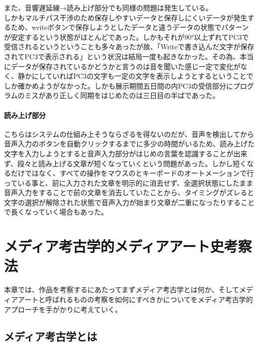 \documentclass[a4paper,report]{jsbook}
\begin{document}
また、音響遅延線→読み上げ部分でも同様の問題は発生している。\\
しかもマルチパス干渉のため保存しやすいデータと保存しにくいデータが発生するため、writeボタンで保存しようとしたデータと違うデータの状態でパターンが安定するという状態がほとんどであった。しかもそれが90°以上ずれてPC3で受信されるというということも多々あったが故、「Writeで書き込んだ文字が保存されてPC3で表示される」という状況は結局一度も起きなかった。その為、本当にデータが保存されているかどうかと言うのは音を聞いた感じ一定で変化がなく、静かにしていればPC3の文字も一定の文字を表示しようとするということでしか確かめようがなかった。しかも展示期間五日間の内PC3の受信部分にプログラムのミスがあり正しく同期をはじめたのは三日目の半ばであった。

\subsubsection{読み上げ部分}\label{ux8aadux307fux4e0aux3052ux90e8ux5206}

こちらはシステムの仕組み上そうならざるを得ないのだが、音声を検出してから音声入力のボタンを自動クリックするまでに多少の時間がいるため、読み上げた文字を入力しようとすると音声入力部分がはじめの言葉を認識することが出来ず、段々と読み上げる文章が短くなっていくという問題があった。しかし短くなるだけではなく、すべての操作をマウスのとキーボードのオートメーションで行っている事と、前に入力された文章を明示的に消去せず、全選択状態にしたまま音声入力をすることで前の文章を消去していたことから、タイミングがズレると文字の選択が解除された状態で音声入力が始まり文章が二重になったりすることで長くなっていく場合もあった。

\chapter{メディア考古学的メディアアート史考察法}\label{ux30e1ux30c7ux30a3ux30a2ux8003ux53e4ux5b66ux7684ux30e1ux30c7ux30a3ux30a2ux30a2ux30fcux30c8ux53f2ux8003ux5bdfux6cd5}

本章では、作品を考察するにあたってまずメディア考古学とは何か、そしてメディアアートと呼ばれるものの考察を如何にすべきかについてをメディア考古学的アプローチを手がかりに考えていく。

\section{メディア考古学とは}\label{ux30e1ux30c7ux30a3ux30a2ux8003ux53e4ux5b66ux3068ux306f}
\end{document}
